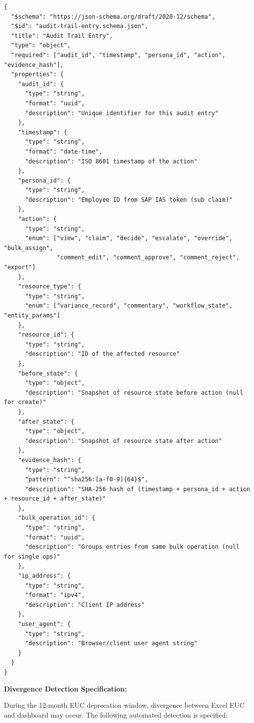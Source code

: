 \begin{tcolorbox}[colback=green!5,colframe=green!70,title=\faIcon{check-circle} Schema Definition: audit-trail-entry.schema.json]
\begin{lstlisting}[language=jsonx,basicstyle=\tiny\ttfamily]
{
  "$schema": "https://json-schema.org/draft/2020-12/schema",
  "$id": "audit-trail-entry.schema.json",
  "title": "Audit Trail Entry",
  "type": "object",
  "required": ["audit_id", "timestamp", "persona_id", "action", "evidence_hash"],
  "properties": {
    "audit_id": {
      "type": "string",
      "format": "uuid",
      "description": "Unique identifier for this audit entry"
    },
    "timestamp": {
      "type": "string",
      "format": "date-time",
      "description": "ISO 8601 timestamp of the action"
    },
    "persona_id": {
      "type": "string",
      "description": "Employee ID from SAP IAS token (sub claim)"
    },
    "action": {
      "type": "string",
      "enum": ["view", "claim", "decide", "escalate", "override", "bulk_assign", 
               "comment_edit", "comment_approve", "comment_reject", "export"]
    },
    "resource_type": {
      "type": "string",
      "enum": ["variance_record", "commentary", "workflow_state", "entity_params"]
    },
    "resource_id": {
      "type": "string",
      "description": "ID of the affected resource"
    },
    "before_state": {
      "type": "object",
      "description": "Snapshot of resource state before action (null for create)"
    },
    "after_state": {
      "type": "object",
      "description": "Snapshot of resource state after action"
    },
    "evidence_hash": {
      "type": "string",
      "pattern": "^sha256:[a-f0-9]{64}$",
      "description": "SHA-256 hash of (timestamp + persona_id + action + resource_id + after_state)"
    },
    "bulk_operation_id": {
      "type": "string",
      "format": "uuid",
      "description": "Groups entries from same bulk operation (null for single ops)"
    },
    "ip_address": {
      "type": "string",
      "format": "ipv4",
      "description": "Client IP address"
    },
    "user_agent": {
      "type": "string",
      "description": "Browser/client user agent string"
    }
  }
}
\end{lstlisting}
\end{tcolorbox}

\textbf{Divergence Detection Specification:}

During the 12-month EUC deprecation window, divergence between Excel EUC and 
dashboard may occur. The following automated detection is specified:

